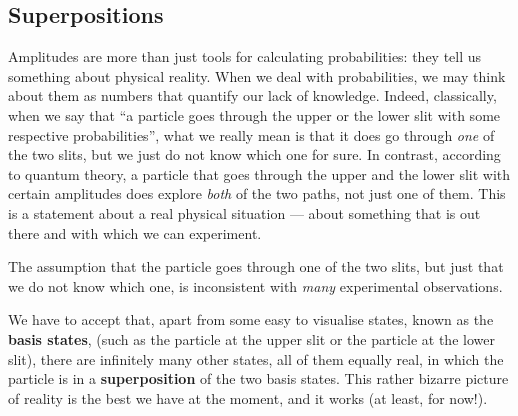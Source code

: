\documentclass[fleqn]{article}
\newenvironment{idea}{\noindent}{\medskip}
\begin{document}
\hypertarget{superpositions}{%
\subsection{Superpositions}\label{superpositions}}

Amplitudes are more than just tools for calculating probabilities: they tell us something about physical reality.
When we deal with probabilities, we may think about them as numbers that quantify our lack of knowledge.
Indeed, classically, when we say that ``a particle goes through the upper or the lower slit with some respective probabilities'', what we really mean is that it does go through \emph{one} of the two slits, but we just do not know which one for sure.
In contrast, according to quantum theory, a particle that goes through the upper and the lower slit with certain amplitudes does explore \emph{both} of the two paths, not just one of them.
This is a statement about a real physical situation --- about something that is out there and with which we can experiment.

\begin{idea}
The assumption that the particle goes through one of the two slits, but just that we do not know which one, is inconsistent with \emph{many} experimental observations.

\end{idea}

We have to accept that, apart from some easy to visualise states, known as the \textbf{basis states}, (such as the particle at the upper slit or the particle at the lower slit), there are infinitely many other states, all of them equally real, in which the particle is in a \textbf{superposition} of the two basis states.
This rather bizarre picture of reality is the best we have at the moment, and it works (at least, for now!).
\end{document}
